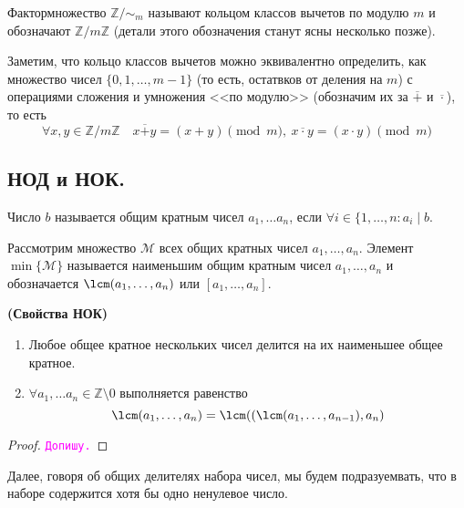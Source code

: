 \documentclass[11pt]{article}
\begin{document}
\begin{definition}

	Фактормножество $\mathbb{Z}/\sim_{m}$ называют кольцом классов вычетов по модулю $m$ и обозначают $\mathbb{Z}/m\mathbb{Z}$ (детали этого обозначения станут ясны несколько позже).

\end{definition}
\begin{remark}

    Заметим, что кольцо классов вычетов можно эквивалентно определить, как множество чисел $\{ 0, 1, \ldots, m - 1\}$ (то есть, остатвков от деления на $m$) с операциями сложения и умножения <<по модулю>> (обозначим их за $\overline{+}$ и $\overline{\cdot}$), то есть
	\[ \forall x, y \in \mathbb{Z}/m\mathbb{Z} \quad x \overline{+} y = (x + y)\pmod{m}, \ x \overline{\cdot} y = (x \cdot y)\pmod{m} \]

\end{remark}
\subsection{НОД и НОК.}
\begin{definition}
	Число $b$ называется общим кратным чисел $a_1, \ldots a_n$, если $\forall i \in \{ 1, \ldots, n\colon a_i \mid b$.
\end{definition}
\begin{definition}
	Рассмотрим множество $\mathcal{M}$ всех общих кратных чисел $a_1, \ldots, a_n$. Элемент $\min\{\mathcal{M}\}$ называется наименьшим общим кратным чисел $a_1, \ldots, a_n$
	и обозначается $\lcm(a_1, \ldots, a_n)$ или $[a_1, \ldots, a_n]$.
\end{definition}
\begin{theorem}\textbf{(Свойства НОК)}
\begin{enumerate}
    \item Любое общее кратное нескольких чисел делится на их наименьшее общее кратное.

	\item $\forall a_{1}, \ldots a_n \in \mathbb{Z}\setminus{0}$ выполняется равенство
		  \[ \lcm(a_1, \ldots, a_n) = \lcm((\lcm(a_1, \ldots, a_{n - 1}), a_n ) \]
\end{enumerate}
\end{theorem}
\begin{proof} \textcolor{magenta}{\texttt{Допишу.}}
\end{proof}

Далее, говоря об общих делителях набора чисел, мы будем подразуемвать, что в наборе содержится хотя бы одно ненулевое число.
\end{document}
